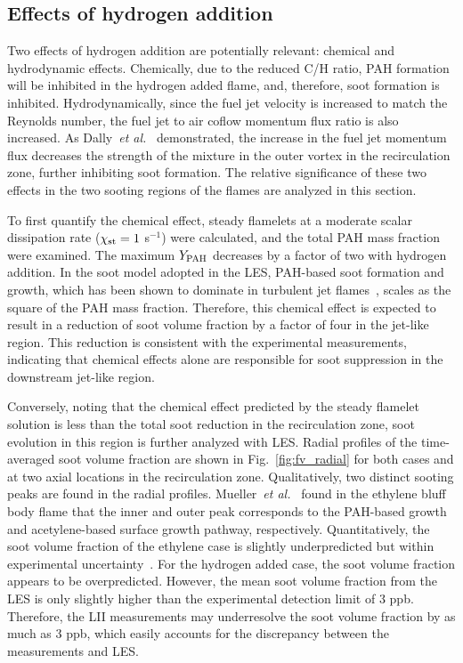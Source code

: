 \documentclass{essci}
\begin{document}
\subsection{Effects of hydrogen addition}

Two effects of hydrogen addition are potentially relevant: chemical and hydrodynamic effects.  Chemically, due to the reduced C/H ratio, PAH formation will be inhibited in the hydrogen added flame, and, therefore, soot formation is inhibited.  Hydrodynamically, since the fuel jet velocity is increased to match the Reynolds number, the fuel jet to air coflow momentum flux ratio is also increased.  As Dally~\emph{et al.}~\cite{dally98b} demonstrated, the increase in the fuel jet momentum flux decreases the strength of the mixture in the outer vortex in the recirculation zone, further inhibiting soot formation.  The relative significance of these two effects in the two sooting regions of the flames are analyzed in this section.

To first quantify the chemical effect, steady flamelets at a moderate scalar dissipation rate ($\chi_{\rm st} = 1$ s$^{-1}$) were calculated, and the total PAH mass fraction were examined.  The maximum $Y_{\rm PAH}$ decreases by a factor of two with hydrogen addition.  In the soot model adopted in the LES, PAH-based soot formation and growth, which has been shown to dominate in turbulent jet flames~\cite{attili15,mueller13}, scales as the square of the PAH mass fraction.  Therefore, this chemical effect is expected to result in a reduction of soot volume fraction by a factor of four in the jet-like region.  This reduction is consistent with the experimental measurements, indicating that chemical effects alone are responsible for soot suppression in the downstream jet-like region.

Conversely, noting that the chemical effect predicted by the steady flamelet solution is less than the total soot reduction in the recirculation zone, soot evolution in this region is further analyzed with LES.  Radial profiles of the time-averaged soot volume fraction are shown in Fig.~\ref{fig:fv_radial} for both cases and at two axial locations in the recirculation zone.  Qualitatively, two distinct sooting peaks are found in the radial profiles.  Mueller~\emph{et al.}~\cite{mueller13} found in the ethylene bluff body flame that the inner and outer peak corresponds to the PAH-based growth and acetylene-based surface growth pathway, respectively.  Quantitatively, the soot volume fraction of the ethylene case is slightly underpredicted but within experimental uncertainty~\cite{mueller13}.  For the hydrogen added case, the soot volume fraction appears to be overpredicted.  However, the mean soot volume fraction from the LES is only slightly higher than the experimental detection limit of 3 ppb.  Therefore, the LII measurements may underresolve the soot volume fraction by as much as 3 ppb, which easily accounts for the discrepancy between the measurements and LES.
\end{document}
